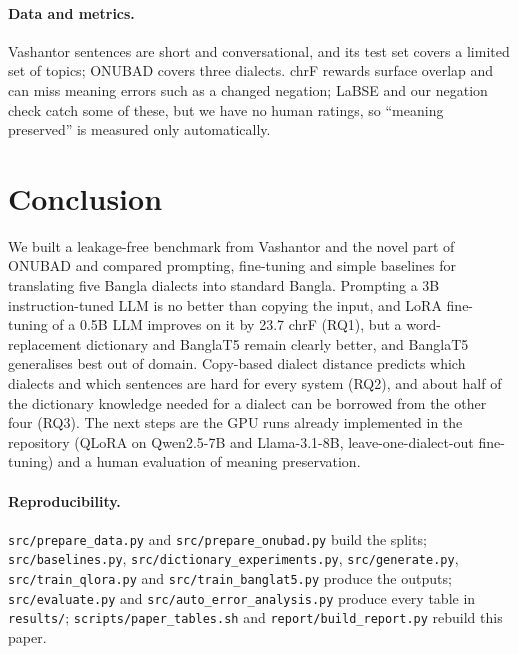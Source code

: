 \documentclass[10pt,twocolumn]{article}
\begin{document}
\paragraph{Data and metrics.} Vashantor sentences are short and conversational, and its test set covers a
limited set of topics; ONUBAD covers three dialects. chrF rewards surface overlap and can miss meaning errors
such as a changed negation; LaBSE and our negation check catch some of these, but we have no human ratings, so
``meaning preserved'' is measured only automatically.

\section{Conclusion}
We built a leakage-free benchmark from Vashantor and the novel part of ONUBAD and compared prompting,
fine-tuning and simple baselines for translating five Bangla dialects into standard Bangla. Prompting a 3B
instruction-tuned LLM is no better than copying the input, and LoRA fine-tuning of a 0.5B LLM improves on it by
23.7 chrF (RQ1), but a word-replacement dictionary and BanglaT5 remain clearly better, and BanglaT5
generalises best out of domain. Copy-based dialect distance predicts which dialects and which sentences are hard
for every system (RQ2), and about half of the dictionary knowledge needed for a dialect can be borrowed from the
other four (RQ3). The next steps are the GPU runs already implemented in the repository (QLoRA on Qwen2.5-7B and
Llama-3.1-8B, leave-one-dialect-out fine-tuning) and a human evaluation of meaning preservation.

{\raggedright\paragraph{Reproducibility.} \texttt{src/prepare\_data.py} and \texttt{src/prepare\_onubad.py} build the
splits; \texttt{src/baselines.py}, \texttt{src/dictionary\_experiments.py}, \texttt{src/generate.py},
\texttt{src/train\_qlora.py} and \texttt{src/train\_banglat5.py} produce the outputs; \texttt{src/evaluate.py}
and \texttt{src/auto\_error\_analysis.py} produce every table in \texttt{results/}; \texttt{scripts/paper\_tables.sh} and \texttt{report/build\_report.py} rebuild this paper.\par}
\end{document}
